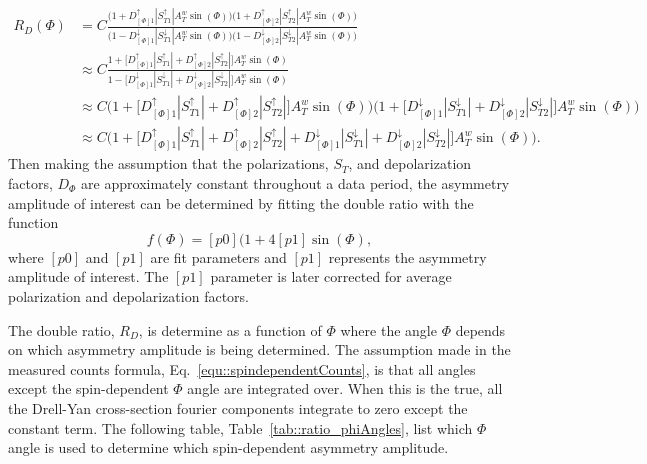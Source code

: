 \begin{align}
  R_D(\Phi) &=
  C\frac{\Big(1+D_{[\Phi]1}^{\uparrow}|S_{T1}^{\uparrow}|A^w_T\sin(\Phi)\Big)
    \Big(1+D_{[\Phi]2}^{\uparrow}|S_{T2}^{\uparrow}|A^w_T\sin(\Phi)\Big)}
  {\Big(1-D_{[\Phi]1}^{\downarrow}|S_{T1}^{\downarrow}|A^w_T\sin(\Phi)\Big)
    \Big(1-D_{[\Phi]2}^{\downarrow}|S_{T2}^{\downarrow}|A^w_T\sin(\Phi)\Big)}
  \\ \nonumber &\approx
  C\frac{1+\Big[D_{[\Phi]1}^{\uparrow}|S_{T1}^{\uparrow}|+D_{[\Phi]2}^{\uparrow}|S_{T2}^{\uparrow}|\Big]
    A^w_T\sin(\Phi)}
  {1-\Big[D_{[\Phi]1}^{\downarrow}|S_{T1}^{\downarrow}|+D_{[\Phi]2}^{\downarrow}|S_{T2}^{\downarrow}|\Big]
    A^w_T\sin(\Phi)} \\ \nonumber &\approx
  C\Big(1+\Big[D_{[\Phi]1}^{\uparrow}|S_{T1}^{\uparrow}|+D_{[\Phi]2}^{\uparrow}|S_{T2}^{\uparrow}|\Big]
  A^w_T\sin(\Phi)\Big)\Big(1+\Big[D_{[\Phi]1}^{\downarrow}|S_{T1}^{\downarrow}|+D_{[\Phi]2}^{\downarrow}|S_{T2}^{\downarrow}|\Big]
  A^w_T\sin(\Phi)\Big) \\ \nonumber &\approx C\Big(1 +
  \Big[D_{[\Phi]1}^{\uparrow}|S_{T1}^{\uparrow}|+D_{[\Phi]2}^{\uparrow}|S_{T2}^{\uparrow}|+D_{[\Phi]1}^{\downarrow}|S_{T1}^{\downarrow}|+D_{[\Phi]2}^{\downarrow}|S_{T2}^{\downarrow}|\Big]A^w_T\sin(\Phi)\Big).
\end{align}
\noindent
Then making the assumption that the polarizations, $S_T$, and depolarization
factors, $D_{\Phi}$ are approximately constant throughout a data period, the
asymmetry amplitude of interest can be determined by fitting the double ratio
with the function
\begin{equation}
  \label{equ::dr_fit_formula}
  f(\Phi) = [p0](1+4[p1]\sin(\Phi),
\end{equation}
\noindent
where $[p0]$ and $[p1]$ are fit parameters and $[p1]$ represents the asymmetry
amplitude of interest.  The $[p1]$ parameter is later corrected for average
polarization and depolarization factors.

The double ratio, $R_D$, is determine as a function of $\Phi$ where the angle
$\Phi$ depends on which asymmetry amplitude is being determined.  The assumption
made in the measured counts formula, Eq.~\ref{equ::spindependentCounts}, is that
all angles except the spin-dependent $\Phi$ angle are integrated over.  When
this is the true, all the Drell-Yan cross-section fourier components integrate
to zero except the constant term.  The following table,
Table~\ref{tab::ratio_phiAngles}, list which $\Phi$ angle is used to determine
which spin-dependent asymmetry amplitude.

